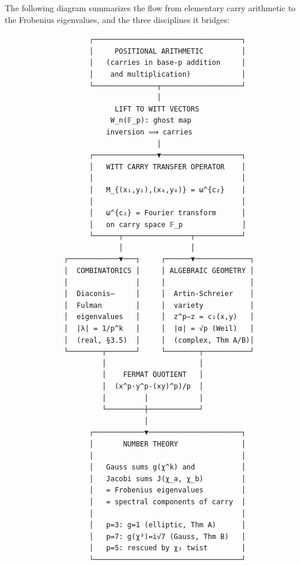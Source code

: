 \documentclass[
  11pt,
]{article}
\begin{document}
The following diagram summarizes the flow from elementary carry arithmetic to
the Frobenius eigenvalues, and the three disciplines it bridges:

\small

\begin{verbatim}
                    ┌───────────────────────────────────┐
                    │     POSITIONAL ARITHMETIC         │
                    │   (carries in base-p addition     │
                    │    and multiplication)            │
                    └───────────────┬───────────────────┘
                                    │
                          LIFT TO WITT VECTORS
                         W_n(𝔽_p): ghost map
                        inversion ⟹ carries
                                    │
                    ┌───────────────▼───────────────────┐
                    │   WITT CARRY TRANSFER OPERATOR    │
                    │                                   │
                    │   M_{(x₁,y₁),(x₀,y₀)} = ω^{c₂}    │
                    │                                   │
                    │   ω^{c₂} = Fourier transform      │
                    │   on carry space 𝔽_p              │
                    └──────┬────────────────┬───────────┘
                           │                │
              ┌────────────▼───┐     ┌──────▼─────────────┐
              │  COMBINATORICS │     │ ALGEBRAIC GEOMETRY │
              │                │     │                    │
              │  Diaconis–     │     │  Artin-Schreier    │
              │  Fulman        │     │  variety           │
              │  eigenvalues   │     │  z^p−z = c₂(x,y)   │
              │  |λ| = 1/p^k   │     │  |α| = √p (Weil)   │
              │  (real, §3.5)  │     │  (complex, Thm A/B)│
              └────────┬───────┘     └────────┬───────────┘
                       │                      │
                       │    FERMAT QUOTIENT   │
                       │  (x^p·y^p-(xy)^p)/p  │
                       │         │            │
                       └─────────┼────────────┘
                                 │
                    ┌────────────▼──────────────────────┐
                    │       NUMBER THEORY               │
                    │                                   │
                    │   Gauss sums g(χ^k) and           │
                    │   Jacobi sums J(χ_a, χ_b)         │
                    │   = Frobenius eigenvalues         │
                    │   = spectral components of carry  │
                    │                                   │
                    │   p=3: g=1 (elliptic, Thm A)      │
                    │   p=7: g(χ³)=i√7 (Gauss, Thm B)   │
                    │   p=5: rescued by χ₂ twist        │
                    └───────────────────────────────────┘
\end{verbatim}
\end{document}
